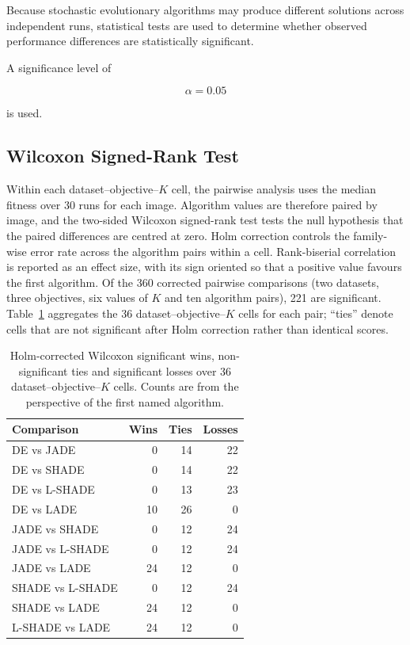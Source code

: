 \documentclass[review,authoryear]{elsarticle}
\begin{document}
Because stochastic evolutionary algorithms may produce different
solutions across independent runs, statistical tests are used to
determine whether observed performance differences are statistically
significant.

A significance level of

\begin{equation}
\alpha = 0.05
\end{equation}

is used.


\subsection{Wilcoxon Signed-Rank Test}

Within each dataset--objective--$K$ cell, the pairwise analysis
uses the median fitness over 30 runs for each image. Algorithm values are
therefore paired by image, and the two-sided Wilcoxon signed-rank test
tests the null hypothesis that the paired differences are centred at
zero. Holm correction controls the family-wise error rate across the
algorithm pairs within a cell. Rank-biserial correlation is reported as
an effect size, with its sign oriented so that a positive value favours
the first algorithm. Of the 360 corrected pairwise comparisons (two
datasets, three objectives, six values of $K$ and ten algorithm pairs),
221 are significant. Table~\ref{tab:wilcoxon-summary} aggregates the 36
dataset--objective--$K$ cells for each pair; ``ties'' denote cells that
are not significant after Holm correction rather than identical scores.

\begin{table}[htbp]
\caption{Holm-corrected Wilcoxon significant wins, non-significant ties
and significant losses over 36 dataset--objective--$K$ cells. Counts are
from the perspective of the first named algorithm.}
\label{tab:wilcoxon-summary}
\centering
\begin{tabular}{lrrr}
\toprule
Comparison & Wins & Ties & Losses \\
\midrule
DE vs JADE & 0 & 14 & 22 \\
DE vs SHADE & 0 & 14 & 22 \\
DE vs L-SHADE & 0 & 13 & 23 \\
DE vs LADE & 10 & 26 & 0 \\
JADE vs SHADE & 0 & 12 & 24 \\
JADE vs L-SHADE & 0 & 12 & 24 \\
JADE vs LADE & 24 & 12 & 0 \\
SHADE vs L-SHADE & 0 & 12 & 24 \\
SHADE vs LADE & 24 & 12 & 0 \\
L-SHADE vs LADE & 24 & 12 & 0 \\
\bottomrule
\end{tabular}
\end{table}
\end{document}
